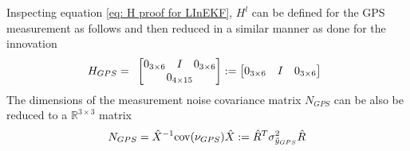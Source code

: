Inspecting equation \eqref{eq: H proof for LInEKF}, $H^l$ can be defined for the GPS measurement as follows and then reduced in a similar manner as done for the innovation
\begin{equation}
    H_{GPS} = \begin{array}{c}
        \begin{bmatrix}
            0_{3 \times 6} & I & 0_{3 \times 6} \\
            \multicolumn{3}{c}{0_{4 \times 15}}
        \end{bmatrix} := \begin{bmatrix}
        0_{3 \times 6} & I & 0_{3 \times 6}
    \end{bmatrix}
    \end{array}
    \label{eq: H full for LInEKF}
\end{equation}
The dimensions of the measurement noise covariance matrix $N_{GPS}$ can be also be reduced to a $\mathbb{R}^{3 \times 3}$ matrix \cite{Contact-Aided_Invarant_EKF}
\begin{equation}
    N_{GPS} = \hat{X}^{-1} \mathrm{cov}(\nu_{GPS}) \hat{X} := \hat{R}^T \sigma_{\Tilde{y}_{GPS}}^2 \hat{R}
\end{equation}

